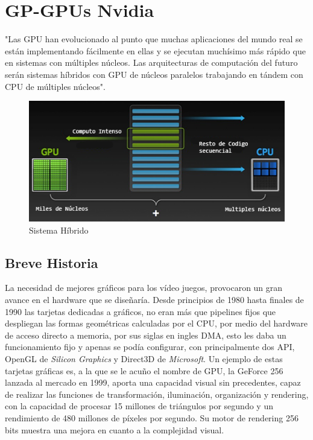 

\chapter{GP-GPUs Nvidia}

"Las GPU han evolucionado al punto que muchas aplicaciones del mundo real se están implementando fácilmente en ellas y se ejecutan muchísimo más rápido que en sistemas con múltiples núcleos. Las arquitecturas de computación del futuro serán sistemas híbridos con GPU de núcleos paralelos trabajando en tándem con CPU de múltiples núcleos".\cite{GPUIntro}

\begin{figure}[h]
			\centering
				\includegraphics[scale=1]{img/how-gpu-acceleration-works.png}
			\caption{Sistema Híbrido}
\end{figure}

\section{Breve Historia}
La necesidad de mejores gráficos para los vídeo juegos, provocaron un gran avance en el hardware que se diseñaría. Desde principios de 1980 hasta finales de 1990 las tarjetas dedicadas a gráficos, no eran más que pipelines fijos que despliegan las formas geométricas calculadas por el CPU, por medio del hardware de acceso directo a memoria, por sus siglas en ingles DMA, esto les daba un funcionamiento fijo y apenas se podía configurar, con principalmente dos API, OpenGL de \textit{Silicon Graphics} y Direct3D de \textit{Microsoft}. Un ejemplo de estas tarjetas gráficas es, a la que se le acuño el nombre de GPU, la GeForce 256\cite{GeForce256} lanzada al mercado en 1999, aporta una capacidad visual sin precedentes, capaz de realizar las funciones de  transformación, iluminación, organización y rendering, con la capacidad de procesar 15 millones de triángulos por segundo y un rendimiento de 480 millones de píxeles por segundo. Su motor de rendering  256 bits muestra una mejora en cuanto a la complejidad visual.

